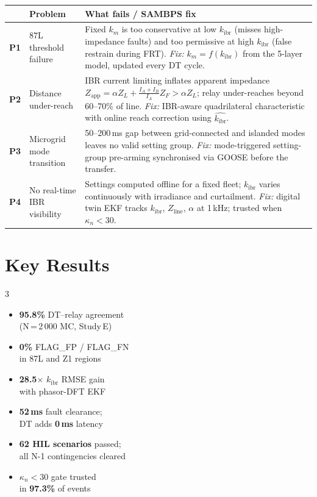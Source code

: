 \documentclass[10pt,a4paper]{article}
\newcommand{\kibr}{k_{\mathrm{ibr}}}
\newcommand{\Zline}{Z_{\mathrm{line}}}
\begin{document}
\small\renewcommand{\arraystretch}{1.22}
\begin{tabular}{@{} >{\bfseries}p{0.3cm} p{3.0cm} p{12.1cm} @{}}
\toprule
 & \textbf{Problem} & \textbf{What fails \;/\; SAMBPS fix} \\
\midrule
P1 & 87L threshold failure &
  Fixed $k_m$ is too conservative at low $\kibr$ (misses high-impedance faults)
  and too permissive at high $\kibr$ (false restrain during FRT).
  \textit{Fix:} $k_m = f(\kibr)$ from the 5-layer model, updated every DT cycle. \\
P2 & Distance under-reach &
  IBR current limiting inflates apparent impedance
  $Z_{\mathrm{app}} = \alpha Z_L + \tfrac{I_A+I_B}{I_A}Z_F > \alpha Z_L$;
  relay under-reaches beyond 60--70\% of line.
  \textit{Fix:} IBR-aware quadrilateral characteristic with online reach correction
  using $\hat{\kibr}$. \\
P3 & Microgrid mode transition &
  50--200\,ms gap between grid-connected and islanded modes leaves no valid
  setting group.
  \textit{Fix:} mode-triggered setting-group pre-arming synchronised via GOOSE
  before the transfer. \\
P4 & No real-time IBR visibility &
  Settings computed offline for a fixed fleet; $\kibr$ varies continuously with
  irradiance and curtailment.
  \textit{Fix:} digital twin EKF tracks $\kibr$, $\Zline$, $\alpha$ at 1\,kHz;
  trusted when $\kappa_n < 30$. \\
\bottomrule
\end{tabular}

\vspace{3pt}

\section{Key Results}

\small
\begin{multicols}{3}
\begin{itemize}[leftmargin=1em, itemsep=1pt, topsep=0pt]
  \item \textbf{95.8\%} DT--relay agreement\\(N\,=\,2\,000 MC, Study\,E)
  \item \textbf{0\%} FLAG\_FP / FLAG\_FN\\in 87L and Z1 regions
  \item \textbf{28.5$\times$} $\kibr$ RMSE gain\\with phasor-DFT EKF
  \item \textbf{52\,ms} fault clearance;\\DT adds \textbf{0\,ms} latency
  \item \textbf{62 HIL scenarios} passed;\\all N-1 contingencies cleared
  \item $\kappa_n < 30$ gate trusted\\in \textbf{97.3\%} of events
\end{itemize}
\end{multicols}
\end{document}
